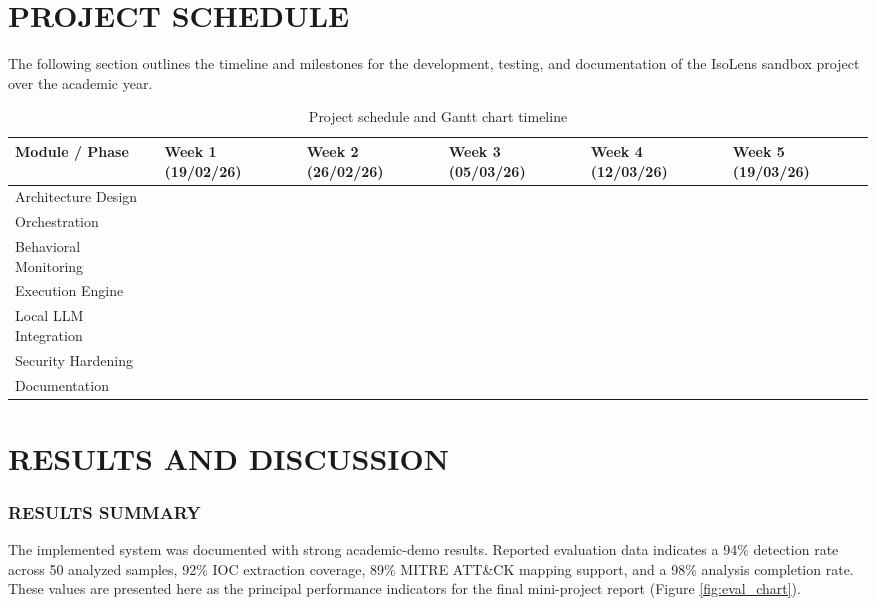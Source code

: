 \documentclass[a4paper,12pt,oneside]{report}
\begin{document}
\chapter{PROJECT SCHEDULE}
The following section outlines the timeline and milestones for the development, testing, and documentation of the IsoLens sandbox project over the academic year.

\begin{table}[H]
\centering
\caption{Project schedule and Gantt chart timeline}
\label{tab:project_schedule}
\renewcommand{\arraystretch}{1.5}
\setlength{\tabcolsep}{3pt}
\begin{tabularx}{\textwidth}{>{\raggedright\arraybackslash}X >{\centering\arraybackslash}p{2cm} >{\centering\arraybackslash}p{2cm} >{\centering\arraybackslash}p{2cm} >{\centering\arraybackslash}p{2cm} >{\centering\arraybackslash}p{2cm}}
\toprule
\rowcolor{black!10}
\textbf{Module / Phase} & \textbf{Week 1 \newline(19/02/26)} & \textbf{Week 2 \newline(26/02/26)} & \textbf{Week 3 \newline(05/03/26)} & \textbf{Week 4 \newline(12/03/26)} & \textbf{Week 5 \newline(19/03/26)} \\
\midrule
Architecture Design & \cellcolor{black!70} & & & & \\
Orchestration & \cellcolor{black!70} & \cellcolor{black!70} & & & \\
Behavioral Monitoring & & \cellcolor{black!70} & \cellcolor{black!70} & & \\
Execution Engine & & & \cellcolor{black!70} & & \\
Local LLM Integration & & & & \cellcolor{black!70} & \\
Security Hardening & & & & \cellcolor{black!70} & \cellcolor{black!70} \\
Documentation & & & & & \cellcolor{black!70} \\
\bottomrule
\end{tabularx}
\end{table}


\chapter{RESULTS AND DISCUSSION}
\subsection{RESULTS SUMMARY}
The implemented system was documented with strong academic-demo results. Reported evaluation data indicates a 94\% detection rate across 50 analyzed samples, 92\% IOC extraction coverage, 89\% MITRE ATT\&CK mapping support, and a 98\% analysis completion rate. These values are presented here as the principal performance indicators for the final mini-project report (Figure \ref{fig:eval_chart}).
\end{document}
